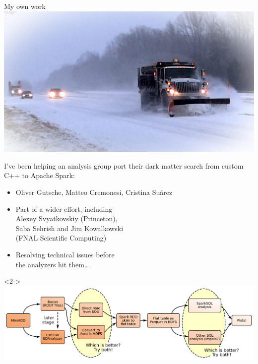 \documentclass{beamer}
\begin{document}
\begin{frame}{My own work}
\vspace{2.5 cm}
\mbox{ } \hfill {\hspace{0.6 cm}\includegraphics[height=2.5 cm]{snowplow.jpg}\hspace{-0.6 cm}}

\vspace{-4.7 cm}
I've been helping an analysis group port their dark matter search from custom C++ to Apache Spark:
\begin{itemize}
\item Oliver Gutsche, Matteo Cremonesi, Cristina Su\'arez
\item Part of a wider effort, including \\ Alexey Svyatkovskiy (Princeton), \\ Saba Sehrish and Jim Kowalkowski \\ (FNAL Scientific Computing)
\item Resolving technical issues before \\ the analyzers hit them\ldots
\end{itemize}

\vspace{0.3 cm}
\begin{uncoverenv}<2->
\mbox{ } \hfill \includegraphics[width=0.8\linewidth]{spark_workflow.pdf} \hfill \mbox{ }
\end{uncoverenv}
\end{frame}
\end{document}

